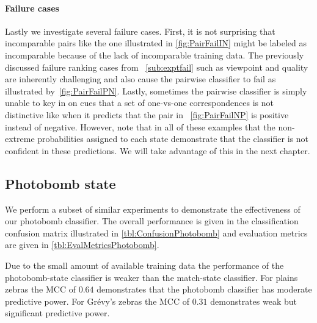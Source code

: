         \MatchPrune{}
        
        \paragraph{Failure cases}

        Lastly we investigate several failure cases.
        First, it is not surprising that incomparable pairs like the one illustrated in \cref{fig:PairFailIN}
          might be labeled as incomparable because of the lack of incomparable training data.
        The previously discussed failure ranking cases from ~\cref{sub:exptfail} such as viewpoint and quality
          are inherently challenging and also cause the pairwise classifier to fail as illustrated
          by~\cref{fig:PairFailPN}.
        Lastly, sometimes the pairwise classifier is simply unable to key in on cues that a set of one-vs-one
          correspondences is not distinctive like when it predicts that the pair in ~\cref{fig:PairFailNP} is
          positive instead of negative.
        However, note that in all of these examples that the non-extreme probabilities assigned to each state
          demonstrate that the classifier is not confident in these predictions.
        We will take advantage of this in the next chapter.
        

        \PairFailIN{} 

        \PairFailPN{}

        \PairFailNP{}

        \FloatBarrier{}


    \FloatBarrier{}
    \subsection{Photobomb state}
        We perform a subset of similar experiments to demonstrate the effectiveness of our photobomb classifier.
        The overall performance is given in the classification confusion matrix illustrated in
          \cref{tbl:ConfusionPhotobomb} and evaluation metrics are given in \cref{tbl:EvalMetricsPhotobomb}.

        Due to the small amount of available training data the performance of the photobomb-state classifier is
          weaker than the match-state classifier.
        For plains zebras the MCC of $0.64$ demonstrates that the photobomb classifier has moderate predictive
          power.
        For Grévy's zebras the MCC of $0.31$ demonstrates weak but significant predictive power.

